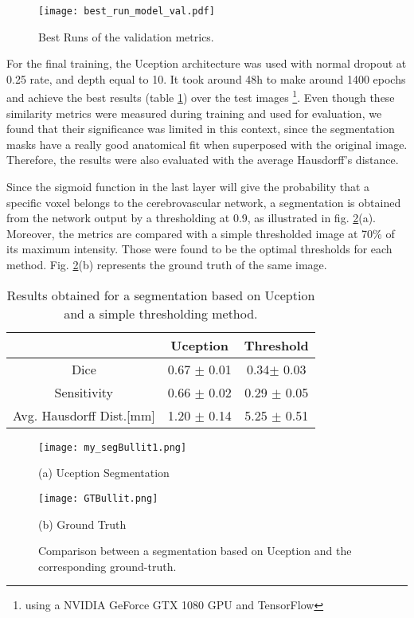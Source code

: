 \documentclass{article}
\begin{document}
\begin{figure}[ht]
\texttt{[image: best\_run\_model\_val.pdf]}
\caption{Best Runs of the validation metrics.}
\label{fig:best_val}
\end{figure}

For the final training, the Uception architecture was used with normal dropout at 0.25 rate, and depth equal to 10. It took around 48h to make around 1400 epochs and achieve the best results (table \ref{table:results}) over the test images \footnote{using a NVIDIA GeForce GTX 1080 GPU and TensorFlow}.  Even though these similarity metrics were measured during training and used for evaluation, we found that their significance was limited in this context, since the segmentation masks have a really good anatomical fit when superposed with the original image. Therefore, the results were also evaluated with the average Hausdorff's distance.

Since the sigmoid function in the last layer will give the probability that a specific voxel belongs to the cerebrovascular network, a segmentation is obtained from the network output by a thresholding at 0.9, as illustrated in fig. \ref{fig:resukts_img}(a). Moreover, the metrics are compared with a simple thresholded image at 70\% of its maximum intensity. Those were found to be the optimal thresholds for each method. Fig. \ref{fig:resukts_img}(b) represents the ground truth of the same image.

\begin{table}[ht]
\begin{tabular}{||c||c|c||} 
\hline
& Uception & Threshold \\ [0.5ex] 
\hline\hline
Dice &   0.67 $\pm$ 0.01 & 0.34$\pm$ 0.03 \\ 
\hline
Sensitivity & 0.66 $\pm$ 0.02 & 0.29 $\pm$ 0.05 \\[1ex] 
 \hline
Avg. Hausdorff Dist.[mm]  & 1.20 $\pm$  0.14 & 5.25 $\pm$  0.51 \\[1ex] 
 \hline
\end{tabular}
\caption{Results obtained for a segmentation based on Uception and a simple thresholding method.}
\label{table:results}
\end{table}


\begin{figure}[htb]
\begin{minipage}[b]{.48\linewidth}
  \centering
  \centerline{\texttt{[image: my\_segBullit1.png]}}
  \centerline{(a) Uception Segmentation}\medskip
\end{minipage}
\begin{minipage}[b]{0.48\linewidth}
  \centering
  \centerline{\texttt{[image: GTBullit.png]}}
  \centerline{(b) Ground Truth}\medskip
\end{minipage}
\caption{Comparison between a segmentation based on Uception and the corresponding ground-truth.}
\label{fig:resukts_img}
\end{figure}
\end{document}
